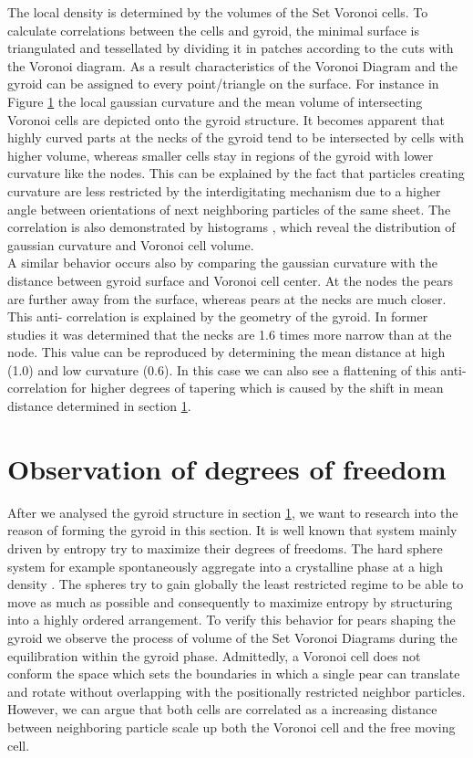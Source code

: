 \documentclass[epj,onecolumn]{webofc}
\begin{document}
The local density is determined by the volumes of the Set Voronoi cells. To calculate correlations between the cells and gyroid, the minimal surface is triangulated and tessellated by dividing it in patches according to the cuts with the Voronoi diagram. As a 
result characteristics of the Voronoi Diagram and the gyroid  can be assigned to every point/triangle on the surface. For instance in Figure \ref{} the local gaussian curvature and the mean volume of intersecting Voronoi cells are depicted onto the gyroid 
structure. It becomes apparent that highly curved parts at the necks of the gyroid tend to be intersected by cells with higher volume, whereas smaller cells stay in regions of the gyroid with lower curvature like the nodes. This can be explained by the fact that 
particles creating curvature are less restricted by the interdigitating mechanism due to a higher angle between orientations of next neighboring particles of the same sheet. The correlation is also demonstrated by histograms , which reveal the distribution of 
gaussian curvature and Voronoi cell volume.\\

A similar behavior occurs also by comparing the gaussian curvature with the distance between gyroid surface and Voronoi cell center. At the nodes the pears are further away from the surface, whereas pears at the necks are much closer. This anti-
correlation is explained by the geometry of the gyroid. In former studies it was determined that the necks are 1.6 times more narrow than at the node. This value can be reproduced by determining the mean distance at high (1.0) and low curvature (0.6). In this 
case we can also see a flattening of this anti-correlation for higher degrees of tapering which is caused by the shift in mean distance determined in section \ref{}.\\

\section{Observation of degrees of freedom}

After we analysed the gyroid structure in section \ref{}, we want to research into the reason of forming the gyroid in this section. It is well known that system mainly driven by entropy try to maximize their degrees of freedoms. The hard sphere system for 
example spontaneously aggregate into a crystalline phase at a high density \cite{}. The spheres try to gain globally the least restricted regime to be able to move as much as possible and consequently to maximize entropy by structuring into a highly ordered 
arrangement. To verify this behavior for pears shaping the gyroid we observe the process of volume of the Set Voronoi Diagrams during the equilibration within the gyroid phase. Admittedly, a Voronoi cell does not conform the space which sets the 
boundaries in which a single pear can translate and rotate without overlapping with the positionally restricted neighbor particles. However, we can argue that both cells are correlated as a increasing distance between neighboring particle scale up both the 
Voronoi cell and the free moving cell.\\
\end{document}
